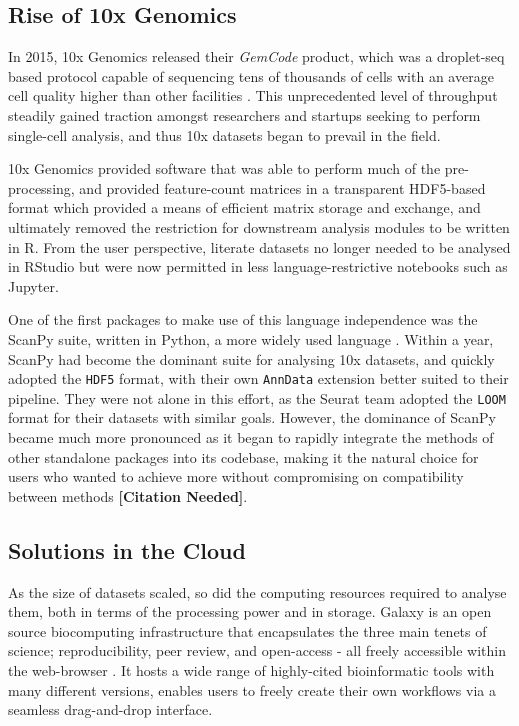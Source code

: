 \documentclass[a4paper,num-refs]{oup-contemporary}
\newcommand{\prog}[1]{\textit{#1}}
\newcommand{\fileformat}[1]{\texttt{#1}}
\newcommand{\citeneed}{{\bf\tiny [Citation Needed]}}
\begin{document}

\subsection{Rise of 10x Genomics}
In 2015, 10x Genomics released their \prog{GemCode} product, which was a droplet-seq based protocol capable of sequencing tens of thousands of cells with an average cell quality higher than other facilities \citep{vickovic2016massive}. This unprecedented level of throughput steadily gained traction amongst researchers and startups seeking to perform single-cell analysis, and thus 10x datasets began to prevail in the field.

10x Genomics provided software that was able to perform much of the pre-processing, and provided feature-count matrices in a transparent HDF5-based format which provided a means of efficient matrix storage and exchange, and ultimately removed the restriction for downstream analysis modules to be written in R. From the user perspective, literate datasets no longer needed to be analysed in RStudio but were now permitted in less language-restrictive notebooks such as Jupyter\citep{allaire2012rstudio,kluyver2016jupyter}.

One of the first packages to make use of this language independence was the ScanPy suite, written in Python, a more widely used language \citep{stackoverflow2019,wolf2018scanpy}. Within a year, ScanPy had become the dominant suite for analysing 10x datasets, and quickly adopted the \fileformat{HDF5} format, with their own \fileformat{AnnData} extension better suited to their pipeline. They were not alone in this effort, as the Seurat team adopted the \fileformat{LOOM} format for their datasets with similar goals. However, the dominance of ScanPy became much more pronounced as it began to rapidly integrate the methods of other standalone packages into its codebase, making it the natural choice for users who wanted to achieve more without compromising on compatibility between methods \citeneed.

\subsection{Solutions in the Cloud}

As the size of datasets scaled, so did the computing resources required to analyse them, both in terms of the processing power and in storage. Galaxy is an open source biocomputing infrastructure that encapsulates the three main tenets of science; reproducibility, peer review, and open-access - all freely accessible within the web-browser \citep{afgan2016galaxy}. It hosts a wide range of highly-cited bioinformatic tools with many different versions, enables users to freely create their own workflows via a seamless drag-and-drop interface.
\end{document}
